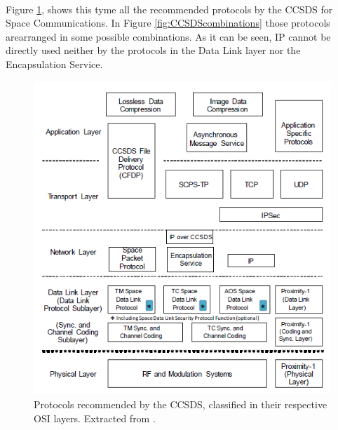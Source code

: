 \paragraph{}Figure \ref{fig:CCSDSprotocols}, shows this tyme all the recommended protocols by the CCSDS for Space Communications. In Figure \ref{fig:CCSDScombinations} those protocols arearranged in some possible combinations. As it can be seen, IP cannot be directly used neither by the protocols in the Data Link layer nor the Encapsulation Service.
\begin{figure}[H]
\begin{center}
\includegraphics[scale=1]{CCSDSprotocols.PNG}
\caption[CCSDS Recommended Protocols]{Protocols recommended by the CCSDS, classified in their respective OSI layers. Extracted from \cite{CCSDSOverview}.}
\label{fig:CCSDSprotocols}
\end{center}
\end{figure}
